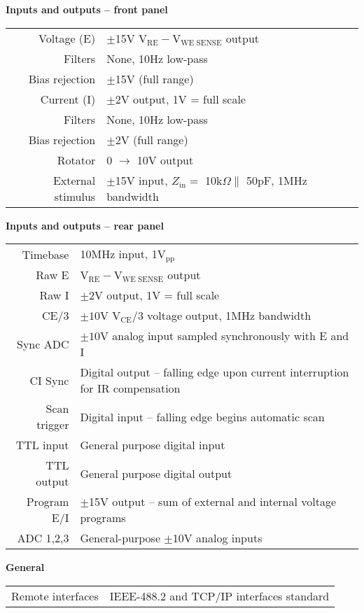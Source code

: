 \noindent \textbf{Inputs and outputs -- front panel}
\medskip \\ \medskip
\begin{tabular}{R}
    Voltage (E)     &$\pm$15V $\mathrm{V_{RE} - V_{WE \; SENSE}}$ output\\
    \hspace*{3mm}Filters         & None, 10Hz low-pass\\
    \hspace*{3mm}Bias rejection & $\pm$15V (full range)\\
    Current (I)     &$\pm$2V output, 1V = full scale\\
    \hspace*{3mm}Filters         & None, 10Hz low-pass\\
    \hspace*{3mm}Bias rejection & $\pm$2V (full range)\\
    Rotator         &0 $\rightarrow$ 10V output\\
    External stimulus &$\pm$15V input, $Z_{\mbox{in}} =$ 10k$\Omega \parallel$ 50pF, 1MHz bandwidth\\
\end{tabular}

\noindent \textbf{Inputs and outputs -- rear panel}
\medskip \\ \medskip
\begin{tabular}{R}
    Timebase    &10MHz input, 1V$_{\mbox{pp}}$\\
    Raw E       &$\mathrm{V_{RE} - V_{WE \; SENSE}}$ output\\
    Raw I       &$\pm$2V output, 1V = full scale\\
    CE/3        &$\pm10$V $\mathrm{V_{CE}/3}$ voltage output,  1MHz bandwidth\\ 
    Sync ADC    &$\pm10$V analog input sampled synchronously with E and I\\
    CI Sync     &Digital output -- falling edge upon current interruption for IR compensation\\
    Scan trigger    &Digital input -- falling edge begins automatic scan\\
    TTL input   &General purpose digital input\\
    TTL output  &General purpose digital output\\
    Program E/I &$\pm$15V output -- sum of external and internal voltage programs\\
    ADC 1,2,3   &General-purpose $\pm$10V analog inputs\\
 \end{tabular}   


\noindent \textbf{General}
\medskip \\ \medskip
\begin{tabular}{R}
    Remote interfaces  &IEEE-488.2 and TCP/IP interfaces standard
\end{tabular}



